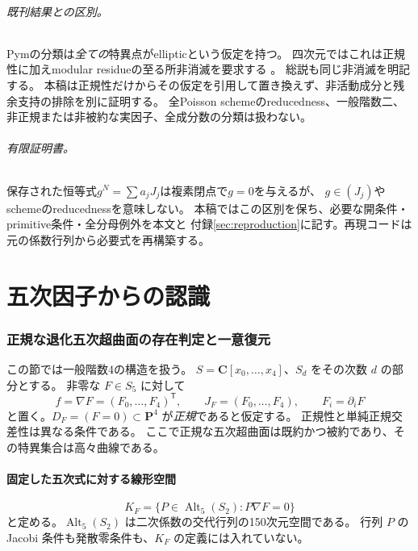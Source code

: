 \documentclass[11pt,a4paper]{ltjsarticle}
\newcommand{\CC}{\mathbf C}\newcommand{\QQ}{\mathbf Q}
\newcommand{\PP}{\mathbf P}\renewcommand{\AA}{\mathbf A}
\theoremstyle{remark}\newtheorem{remark}[theorem]{注意}
\begin{document}
\paragraph{既刊結果との区別。}
Pymの分類\cite[Theorem 1.3]{PymElliptic}は\emph{全ての}特異点がellipticという仮定を持つ。
四次元ではこれは正規性に加えmodular residueの至る所非消滅を要求する
\cite[Definition 4.2, Remark 4.4]{PymElliptic}。
総説\cite[Theorem 5.12]{PymSurvey}も同じ非消滅を明記する。
本稿は正規性だけからその仮定を引用して置き換えず、非活動成分と残余支持の排除を別に証明する。
全Poisson schemeのreducedness、一般階数二、非正規または非被約な実因子、全成分数の分類は扱わない。

\paragraph{有限証明書。}
保存された恒等式$g^N=\sum a_jJ_j$は複素閉点で$g=0$を与えるが、
$g\in(J_j)$やschemeのreducednessを意味しない。
本稿ではこの区別を保ち、必要な開条件・primitive条件・全分母例外を本文と
付録\ref{sec:reproduction}に記す。再現コードは元の係数行列から必要式を再構築する。
\part{五次因子からの認識}


\section{正規な退化五次超曲面の存在判定と一意復元}
\label{sec:normal}

この節では一般階数4の構造を扱う。
$S=\CC[x_0,\ldots,x_4]$、$S_d$ をその次数 $d$ の部分とする。
非零な $F\in S_5$ に対して
\[
 f=\nabla F=(F_0,\ldots,F_4)^{\mathsf T},\qquad
 J_F=(F_0,\ldots,F_4),\qquad F_i=\partial_iF
\]
と置く。$D_F=(F=0)\subset\PP^4$ が\emph{正規}であると仮定する。
正規性と単純正規交差性は異なる条件である。
ここで正規な五次超曲面は既約かつ被約であり、その特異集合は高々曲線である。

\subsection{固定した五次式に対する線形空間}

\[
 K_F=\{P\in\operatorname{Alt}_5(S_2):P\nabla F=0\}
\]
と定める。$\operatorname{Alt}_5(S_2)$ は二次係数の交代行列の150次元空間である。
行列 $P$ の Jacobi 条件も発散零条件も、$K_F$ の定義には入れていない。
\end{document}
